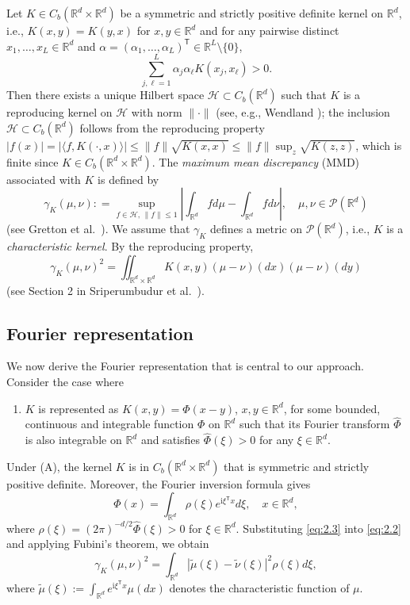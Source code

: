 \documentclass[11pt,leqno]{article}
\theoremstyle{plain}
\theoremstyle{remark}
\theoremstyle{definition}
\numberwithin{equation}{section}
\numberwithin{figure}{section}
\numberwithin{table}{section}
\numberwithin{algorithm}{section}
\newcommand{\RR}{\mathbb{R}}
\newcommand{\cP}{\mathcal{P}}
\newcommand{\cH}{\mathcal{H}}
\begin{document}
Let $K\in C_b(\RR^d\times\RR^d)$ be a symmetric and strictly positive definite kernel on $\RR^d$, i.e.,
$K(x,y)=K(y,x)$ for $x,y\in\RR^d$ and for any pairwise distinct $x_1,\ldots,x_L\in \RR^d$ and
$\alpha=(\alpha_1,\ldots,\alpha_L)^{\mathsf{T}}\in\RR^L\setminus\{0\}$,
\[
 \sum_{j,\ell=1}^L\alpha_j\alpha_{\ell}K(x_j,x_{\ell})>0.
\]
Then there exists a unique Hilbert space $\cH\subset C_b(\RR^d)$ such that $K$ is a reproducing kernel on
$\cH$ with norm $\|\cdot\|$ (see, e.g., Wendland \cite{wen:2005});
the inclusion $\cH\subset C_b(\RR^d)$ follows from the reproducing property
$|f(x)|=|\langle f,K(\cdot,x)\rangle|\le \|f\|\sqrt{K(x,x)}\le \|f\|\sup_z\sqrt{K(z,z)}$,
which is finite since $K\in C_b(\RR^d\times\RR^d)$.
The \textit{maximum mean discrepancy} (MMD) associated with $K$ is defined by
\begin{equation}
\label{eq:2.1}
 \gamma_K(\mu,\nu): = \sup_{f\in\cH, \, \|f\|\le 1}\left|\int_{\RR^d} f d\mu - \int_{\RR^d} f d\nu\right|,
 \quad \mu,\nu\in\cP(\RR^d)
\end{equation}
(see Gretton et al.~\cite{gre-etal:2006}).
We assume that $\gamma_K$ defines a metric on $\cP(\RR^d)$, i.e., $K$ is a \textit{characteristic kernel}.
By the reproducing property,
\begin{equation}
\label{eq:2.2}
 \gamma_K(\mu,\nu)^2 = \iint\nolimits_{\RR^d\times\RR^d}K(x,y)(\mu-\nu)(dx)(\mu-\nu)(dy)
\end{equation}
(see Section 2 in Sriperumbudur et al.~\cite{sri-etal:2010}).


\subsection{Fourier representation}\label{sec:2.2}

We now derive the Fourier representation that is central to our approach.
Consider the case where
\begin{enumerate}
\item[(A)] $K$ is represented as $K(x,y)=\Phi(x-y)$, $x,y\in\RR^d$, for some bounded, continuous and integrable function $\Phi$ on $\RR^d$ such that
 its Fourier transform $\widehat{\Phi}$ is also integrable on $\RR^d$ and satisfies $\widehat{\Phi}(\xi)>0$ for any $\xi\in\RR^d$.
\end{enumerate}
Under (A), the kernel $K$ is in $C_b(\RR^d\times\RR^d)$ that is symmetric and strictly positive definite.  
Moreover, the Fourier inversion formula gives
\begin{equation}
\label{eq:2.3}
\Phi(x) = \int_{\RR^d}\rho(\xi)e^{\mathrm{i}\xi^{\mathsf{T}}x}d\xi, \quad x\in\RR^d,
\end{equation}
where $\rho(\xi)=(2\pi)^{-d/2}\widehat{\Phi}(\xi)>0$ for $\xi\in\RR^d$.
Substituting \eqref{eq:2.3} into \eqref{eq:2.2} and applying Fubini's theorem, we obtain
\begin{equation}
\label{eq:2.4}
\gamma_K(\mu,\nu)^2 = \int_{\RR^d}|\tilde{\mu}(\xi) - \tilde{\nu}(\xi)|^2 \rho(\xi) d\xi,
\end{equation}
where $\tilde{\mu}(\xi):=\int_{\RR^d}e^{\mathrm{i}\xi^{\mathsf{T}}x}\mu(dx)$ denotes the characteristic function of $\mu$.
\end{document}
